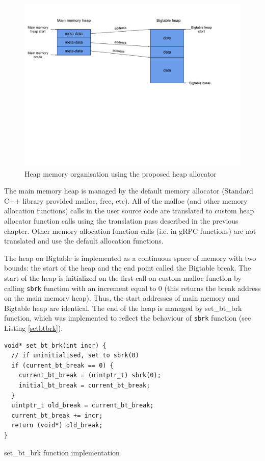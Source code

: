 \documentclass[bsc,frontabs,twoside,singlespacing,parskip,deptreport]{infthesis}     %
\begin{document}
\begin{figure}[H]
\centering
\includegraphics[width=1\textwidth]{images/heap_organisation}
\caption{Heap memory organisation using the proposed heap allocator}
\label{fig:heap_organisation}
\end{figure}

The main memory heap is managed by the default memory allocator (Standard C++ library provided malloc, free, etc). All of the malloc (and other memory allocation functions) calls in the user source code are translated to custom heap allocator function calls using the translation pass described in the previous chapter. Other memory allocation function calls (i.e. in gRPC functions) are not translated and use the default allocation functions.

The heap on Bigtable is implemented as a continuous space of memory with two bounds: the start of the heap and the end point  called the Bigtable break. The start of the heap is initialized on the first call on custom malloc function by calling \texttt{sbrk} function with an increment equal to 0 (this returns the break address on the main memory heap). Thus, the start addresses of main memory and Bigtable heap are identical. The end of the heap is managed by set\_bt\_brk function, which was implemented to reflect the behaviour of \texttt{sbrk} function (see Listing \ref{setbtbrk}).

\begin{listing}
\begin{verbatim}
void* set_bt_brk(int incr) {
  // if uninitialised, set to sbrk(0)
  if (current_bt_break == 0) {
    current_bt_break = (uintptr_t) sbrk(0);
    initial_bt_break = current_bt_break;
  }
  uintptr_t old_break = current_bt_break;
  current_bt_break += incr;
  return (void*) old_break;
}
\end{verbatim}
\caption{set\_bt\_brk function implementation}
\label{setbtbrk}
\end{listing}
\end{document}
